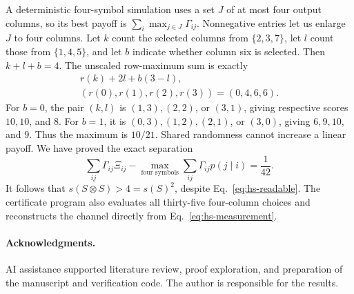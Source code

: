 A deterministic four-symbol simulation uses a set $J$ of at most four output columns, so its best payoff is $\sum_i\max_{j\in J}\Gamma_{ij}$. Nonnegative entries let us enlarge $J$ to four columns. Let $k$ count the selected columns from $\{2,3,7\}$, let $l$ count those from $\{1,4,5\}$, and let $b$ indicate whether column six is selected. Then $k+l+b=4$. The unscaled row-maximum sum is exactly
\begin{equation}\label{eq:hs-score}
\begin{gathered}
 r(k)+2l+b(3-l),\\
 (r(0),r(1),r(2),r(3))=(0,4,6,6).
\end{gathered}
\end{equation}
For $b=0$, the pair $(k,l)$ is $(1,3),(2,2)$, or $(3,1)$, giving respective scores $10,10$, and $8$. For $b=1$, it is $(0,3),(1,2),(2,1)$, or $(3,0)$, giving $6,9,10$, and $9$. Thus the maximum is $10/21$. Shared randomness cannot increase a linear payoff. We have proved the exact separation
\begin{equation}\label{eq:hs-gap}
 \sum_{ij}\Gamma_{ij}\Xi_{ij}
 -\max_{\text{four symbols}}\sum_{ij}\Gamma_{ij}p(j\mid i)
 =\frac1{42}.
\end{equation}
It follows that $s(S\otimes S)>4=s(S)^2$, despite Eq.~\eqref{eq:hs-readable}. The certificate program also evaluates all thirty-five four-column choices and reconstructs the channel directly from Eq.~\eqref{eq:hs-measurement}.

\paragraph{Acknowledgments.}
AI assistance supported literature review, proof exploration, and preparation of the manuscript and verification code. The author is responsible for the results.
